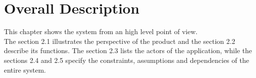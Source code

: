 \chapter{Overall Description}

This chapter shows the system from an high level point of view. \\
The section 2.1 illustrates the perspective of the product and the section 2.2 describe its functions.
The section 2.3 lists the actors of the application, while the sections 2.4 and 2.5 specify the constraints, assumptions and dependencies of the entire system. 







